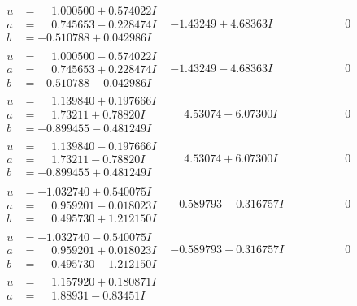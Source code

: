 \documentclass[1p]{elsarticle_modified}
\theoremstyle{definition}
\begin{document}
$$\begin{array}{c|c|c}
 \hline 
\begin{aligned}
u &= \phantom{-}1.000500 + 0.574022 I \\
a &= \phantom{-}0.745653 - 0.228474 I \\
b &= -0.510788 + 0.042986 I\end{aligned}
 & -1.43249 + 4.68363 I & \phantom{-0.000000 } 0 \\ \hline\begin{aligned}
u &= \phantom{-}1.000500 - 0.574022 I \\
a &= \phantom{-}0.745653 + 0.228474 I \\
b &= -0.510788 - 0.042986 I\end{aligned}
 & -1.43249 - 4.68363 I & \phantom{-0.000000 } 0 \\ \hline\begin{aligned}
u &= \phantom{-}1.139840 + 0.197666 I \\
a &= \phantom{-}1.73211 + 0.78820 I \\
b &= -0.899455 - 0.481249 I\end{aligned}
 & \phantom{-}4.53074 - 6.07300 I & \phantom{-0.000000 } 0 \\ \hline\begin{aligned}
u &= \phantom{-}1.139840 - 0.197666 I \\
a &= \phantom{-}1.73211 - 0.78820 I \\
b &= -0.899455 + 0.481249 I\end{aligned}
 & \phantom{-}4.53074 + 6.07300 I & \phantom{-0.000000 } 0 \\ \hline\begin{aligned}
u &= -1.032740 + 0.540075 I \\
a &= \phantom{-}0.959201 - 0.018023 I \\
b &= \phantom{-}0.495730 + 1.212150 I\end{aligned}
 & -0.589793 - 0.316757 I & \phantom{-0.000000 } 0 \\ \hline\begin{aligned}
u &= -1.032740 - 0.540075 I \\
a &= \phantom{-}0.959201 + 0.018023 I \\
b &= \phantom{-}0.495730 - 1.212150 I\end{aligned}
 & -0.589793 + 0.316757 I & \phantom{-0.000000 } 0 \\ \hline\begin{aligned}
u &= \phantom{-}1.157920 + 0.180871 I \\
a &= \phantom{-}1.88931 - 0.83451 I \\

\end{aligned}
\end{array}$$
\end{document}
